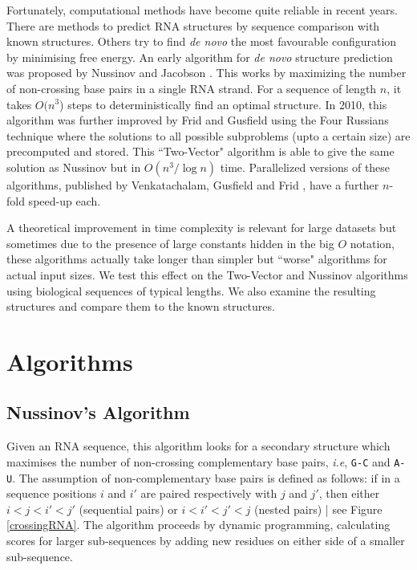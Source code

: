 \documentclass[journal]{IEEEtran}
\begin{document}
Fortunately, computational methods have become quite reliable in recent years. There are methods to predict RNA structures by sequence comparison with known structures. Others try to find \textit{de novo} the most favourable configuration by minimising free energy. An early algorithm for \textit{de novo} structure prediction was proposed by Nussinov and Jacobson \cite{Nussinov1980}. This works by maximizing the number of non-crossing base pairs in a single RNA strand. For a sequence of length $n$, it takes $O(n^3$) steps to deterministically find an optimal structure.  In 2010, this algorithm was further improved by Frid and Gusfield \cite{Frid2010} using the Four Russians technique where the solutions to all possible subproblems (upto a certain size) are precomputed and stored. This ``Two-Vector" algorithm is able to give the same solution as Nussinov but in $O(n^3/\log{n})$ time. Parallelized versions of these algorithms, published by Venkatachalam, Gusfield and Frid \cite{Venkatachalam2014}, have a further $n$-fold speed-up each.

A theoretical improvement in time complexity is relevant for large datasets but sometimes due to the presence of large constants hidden in the big $O$ notation, these algorithms actually take longer than simpler but ``worse" algorithms for actual input sizes. We test this effect on the Two-Vector and Nussinov algorithms using biological sequences of typical lengths. We also examine the resulting structures and compare them to the known structures.

\section{Algorithms}
\subsection{Nussinov's Algorithm}
Given an RNA sequence, this algorithm looks for a secondary structure which maximises the number of non-crossing complementary base pairs, \textit{i.e}, \texttt{G-C} and \texttt{A-U}. The assumption of non-complementary base pairs is defined as follows: if in a sequence positions $i$ and $i'$ are paired respectively with $j$ and $j'$, then either $i<j<i'<j'$ (sequential pairs) or $i<i'<j'<j$ (nested pairs) | see Figure \ref{crossingRNA}. The algorithm proceeds by dynamic programming, calculating scores for larger sub-sequences by adding new residues on either side of a smaller sub-sequence.
\end{document}

